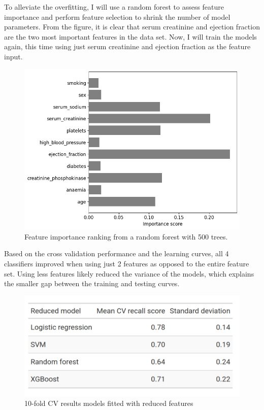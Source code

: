\documentclass[12pt, letterpaper]{article}
\begin{document}
	To alleviate the overfitting, I will use a random forest to assess feature importance and perform feature selection to shrink the number of model parameters. From the figure, it is clear that serum creatinine and ejection fraction are the two most important features in the data set. Now, I will train the models again, this time using just serum creatinine and ejection fraction as the feature input.
	
	\begin{figure}[H]
		\centering
		\includegraphics[width=0.8\linewidth]{figs/feat_imp.png}
		\caption{Feature importance ranking from a random forest with 500 trees.}
		\label{fig:feat_imp}
	\end{figure}
	
	Based on the cross validation performance and the learning curves, all 4 classifiers improved when using just 2 features as opposed to the entire feature set. Using less features likely reduced the variance of the models, which explains the smaller gap between the training and testing curves.
		
	\begin{figure}[H]
		\centering
		\includegraphics[width=0.8\linewidth]{figs/red_cv.png}
		\caption{10-fold CV results models fitted with reduced features}
		\label{fig:red_cv}
	\end{figure}
	
\end{document}
